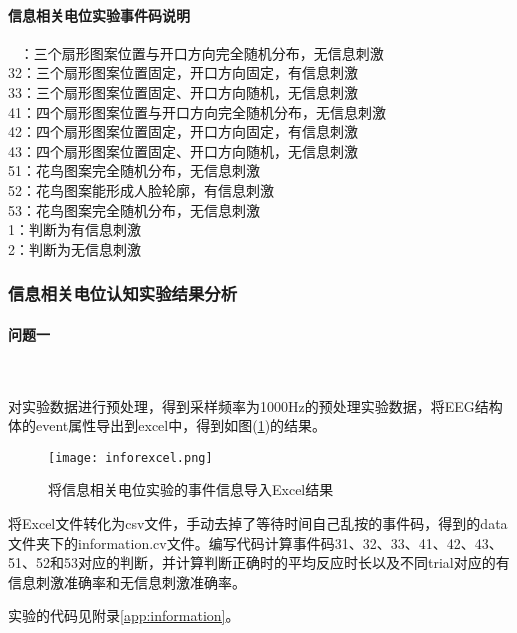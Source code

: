\documentclass{hitreport}
\begin{document}
\paragraph{信息相关电位实验事件码说明}~{}
：三个扇形图案位置与开口方向完全随机分布，无信息刺激\\
32：三个扇形图案位置固定，开口方向固定，有信息刺激\\
33：三个扇形图案位置固定、开口方向随机，无信息刺激\\
41：四个扇形图案位置与开口方向完全随机分布，无信息刺激\\
42：四个扇形图案位置固定，开口方向固定，有信息刺激\\
43：四个扇形图案位置固定、开口方向随机，无信息刺激\\
51：花鸟图案完全随机分布，无信息刺激\\
52：花鸟图案能形成人脸轮廓，有信息刺激\\
53：花鸟图案完全随机分布，无信息刺激\\
1：判断为有信息刺激\\
2：判断为无信息刺激

\subsubsection{信息相关电位认知实验结果分析}

\paragraph{问题一}~{}

对实验数据进行预处理，得到采样频率为1000Hz的预处理实验数据，将EEG结构体的event属性导出到excel中，得到如图(\ref{fig:inforexcel})的结果。

\begin{figure}[htb]
\centering
\texttt{[image: inforexcel.png]}
\caption{将信息相关电位实验的事件信息导入Excel结果}\label{fig:inforexcel}
\end{figure}

将Excel文件转化为csv文件，手动去掉了等待时间自己乱按的事件码，得到的data文件夹下的information.cv文件。编写代码计算事件码31、32、33、41、42、43、51、52和53对应的判断，并计算判断正确时的平均反应时长以及不同trial对应的有信息刺激准确率和无信息刺激准确率。

实验的代码见附录\ref{app:information}。
\end{document}
